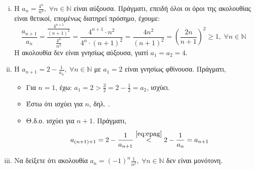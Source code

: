 \documentclass[main.tex]{subfiles}
\begin{document}
\begin{examples}
\begin{enumerate}[i)]
        \item Η $ a_{n}= \frac{4^{n}}{n^{2}}, \; \forall n \in \mathbb{N} $ 
            είναι αύξουσα. Πράγματι, επειδή όλοι οι όροι της ακολουθίας 
            είναι θετικοί, επομένως διατηρεί πρόσημο, έχουμε:
            \[
                \frac{a_{n+1}}{a_{n}} 
                = \frac{\frac{4^{n+1}}{(n+1)^{2}}}{\frac{4^{n}}{n^{2}}} 
                = \frac{4^{n+1}\cdot n^{2}}{4^{n}\cdot (n+1)^{2}} 
                = \frac{4n^{2}}{(n+1)^{2}}
                = \left( \frac{2n}{n+1} \right)^{2} \geq 1, 
                \; \forall n \in \mathbb{N} 
            \]
            Η ακολουθία δεν είναι γνησίως αύξουσα, γιατί $ 
            a_{1}= a_{2}=4$.

        \item Η $ a_{n+1}=2 - \frac{1}{a_{n}}, \; \forall n \in \mathbb{N}
            $ με $ a_{1} = 2 $ είναι γνησίως φθίνουσα. Πράγματι, 
            \begin{itemize}
                \item Για $ n=1 $, έχω: $ a_{1}= 2 >
                    \frac{3}{2} = 2 - \frac{1}{2} = a_{2}$, ισχύει.
                \item Έστω ότι ισχύει για $n$, δηλ.
                    .
                \item Θ.δ.ο. ισχύει για $ n+1 $. Πράγματι, 
                    \[
                        a_{(n+1)+1}=2- \frac{1}{a_{n+1}}
                        \overset{\eqref{eq:epag}}{<} 2 - 
                        \frac{1}{a_{n}} = a_{n+1}
                    \] 
            \end{itemize}

            \item Να δείξετε ότι ακολουθία $ a_{n} = (-1)^{n} \frac{1}{n^{2}}, 
                \; \forall n \in \mathbb{N} $ 
                δεν είναι μονότονη.


\end{enumerate}
\end{examples}
\end{document}
